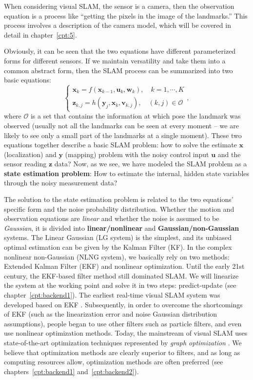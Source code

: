 When considering visual SLAM, the sensor is a camera, then the observation equation is a process like ``getting the pixels in the image of the landmarks.'' This process involves a description of the camera model, which will be covered in detail in chapter~\ref{cpt:5}.

Obviously, it can be seen that the two equations have different parameterized forms for different sensors. If we maintain versatility and take them into a common abstract form, then the SLAM process can be summarized into two basic equations:
\begin{equation}
\label{eq:slamproblem}
\left\{ \begin{array}{l}
{\mathbf{x}_k} = f\left( {{\mathbf{x}_{k - 1}},{\mathbf{u}_k}}, \mathbf{w}_k \right),\quad k=1,\cdots, K\\
{\mathbf{z}_{k,j}} = h\left( {{ \mathbf{y}_j},{ \mathbf{x}_k}}, \mathbf{v}_{k,j} \right), \quad (k,j) \in \mathcal{O}
\end{array} \right. ,
\end{equation}
where $\mathcal{O}$ is a set that contains the information at which pose the landmark was observed (usually not all the landmarks can be seen at every moment -- we are likely to see only a small part of the landmarks  at a single moment). These two equations together describe a basic SLAM problem: how to solve the estimate $\mathbf{x}$ (localization) and $\mathbf{y}$ (mapping) problem with the noisy control input $\mathbf{u}$ and the sensor reading $\mathbf{z}$ data? Now, as we see, we have modeled the SLAM problem as a \textbf{state estimation problem}: How to estimate the internal, hidden state variables through the noisy measurement data?

The solution to the state estimation problem is related to the two equations' specific form and the noise probability distribution. Whether the motion and observation equations are \textit{linear} and whether the noise is assumed to be \textit{Gaussian}, it is divided into \textbf{linear/nonlinear} and \textbf{Gaussian/non-Gaussian} systems. The Linear Gaussian (LG system) is the simplest, and its unbiased optimal estimation can be given by the Kalman Filter (KF). In the complex nonlinear non-Gaussian (NLNG system), we basically rely on two methods: Extended Kalman Filter (EKF) and nonlinear optimization. Until the early 21st century, the EKF-based filter method still dominated SLAM. We will linearize the system at the working point and solve it in two steps: predict-update (see chapter~\ref{cpt:backend1}). The earliest real-time visual SLAM system was developed based on EKF {\cite{Davison2007}}. Subsequently, in order to overcome the shortcomings of EKF (such as the linearization error and noise Gaussian distribution assumptions), people began to use other filters such as particle filters, and even use nonlinear optimization methods. Today, the mainstream of visual SLAM uses state-of-the-art optimization techniques represented by \textit{graph optimization} {\cite{Strasdat2012}}. We believe that optimization methods are clearly superior to filters, and as long as computing resources allow, optimization methods are often preferred (see chapters~\ref{cpt:backend1} and~\ref{cpt:backend2}).

